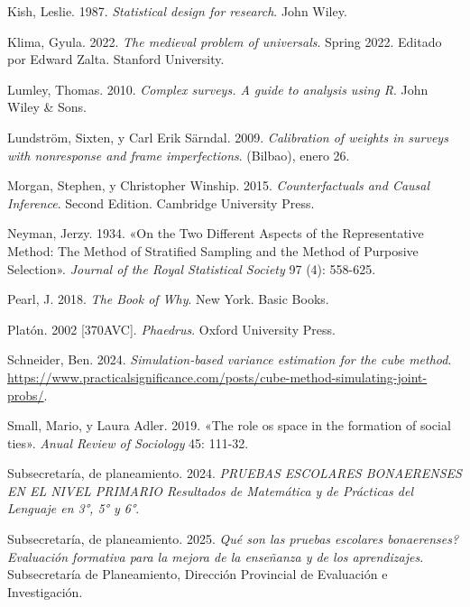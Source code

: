 \documentclass[
  spanish,
  a4paper,
]{scrreprt}
\newlength{\cslhangindent}
\newenvironment{CSLReferences}[2] %
 {\begin{list}{}{%
  \setlength{\itemindent}{0pt}
  \setlength{\leftmargin}{0pt}
  \setlength{\parsep}{0pt}
  \ifodd #1
   \setlength{\leftmargin}{\cslhangindent}
   \setlength{\itemindent}{-1\cslhangindent}
  \fi
  \setlength{\itemsep}{#2\baselineskip}}}
 {\end{list}}
\begin{document}
\begin{CSLReferences}{1}{1}
Kish, Leslie. 1987. \emph{Statistical design for research}. John Wiley.

Klima, Gyula. 2022. \emph{The medieval problem of universals}. Spring
2022. Editado por Edward Zalta. Stanford University.

Lumley, Thomas. 2010. \emph{Complex surveys. A guide to analysis using
R}. John Wiley \& Sons.

Lundström, Sixten, y Carl Erik Särndal. 2009. \emph{Calibration of
weights in surveys with nonresponse and frame imperfections}. (Bilbao),
enero 26.

Morgan, Stephen, y Christopher Winship. 2015. \emph{Counterfactuals and
Causal Inference}. Second Edition. Cambridge University Press.

Neyman, Jerzy. 1934. {«On the Two Different Aspects of the
Representative Method: The Method of Stratified Sampling and the Method
of Purposive Selection»}. \emph{Journal of the Royal Statistical
Society} 97 (4): 558-625.

Pearl, J. 2018. \emph{The Book of Why}. New York. Basic Books.

Platón. 2002 {[}370AVC{]}. \emph{Phaedrus}. Oxford University Press.

Schneider, Ben. 2024. \emph{Simulation-based variance estimation for the
cube method}.
\url{https://www.practicalsignificance.com/posts/cube-method-simulating-joint-probs/}.

Small, Mario, y Laura Adler. 2019. {«The role os space in the formation
of social ties»}. \emph{Anual Review of Sociology} 45: 111-32.

{Subsecretaría, de planeamiento}. 2024. \emph{PRUEBAS ESCOLARES
BONAERENSES EN EL NIVEL PRIMARIO Resultados de Matemática y de Prácticas
del Lenguaje en 3°, 5° y 6°}.

{Subsecretaría, de planeamiento}. 2025. \emph{Qué son las pruebas
escolares bonaerenses? Evaluación formativa para la mejora de la
enseñanza y de los aprendizajes}. Subsecretaría de Planeamiento,
Dirección Provincial de Evaluación e Investigación.


\end{CSLReferences}
\end{document}
